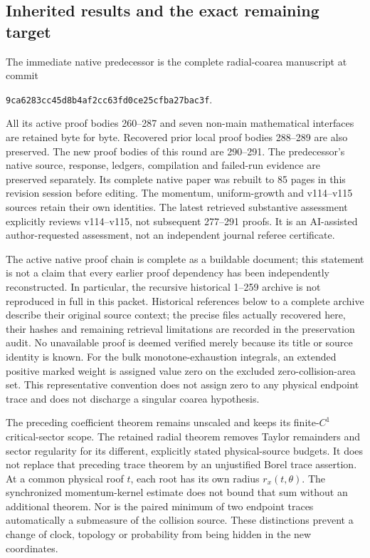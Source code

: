 \documentclass[11pt,reqno]{amsart}
\numberwithin{equation}{section}
\theoremstyle{definition}\newtheorem{definition}[theorem]{Definition}
\theoremstyle{remark}\newtheorem{remark}[theorem]{Remark}
\begin{document}
\subsection*{Inherited results and the exact remaining target}
The immediate native predecessor is the complete radial-coarea manuscript
at commit
\begin{center}
\texttt{9ca6283c\allowbreak c45d8b4a\allowbreak f2cc63fd\allowbreak 0ce25cfb\allowbreak a27bac3f}.
\end{center}
All its active proof bodies 260--287 and seven non-main mathematical
interfaces are retained byte for byte. Recovered prior local proof bodies
288--289 are also preserved. The new proof bodies of this round are
290--291. The predecessor's native source, response, ledgers, compilation
and failed-run evidence are preserved separately. Its complete native
paper was rebuilt to 85 pages in this revision session before editing.
The momentum, uniform-growth and v114--v115 sources retain their own
identities. The latest retrieved substantive assessment explicitly
reviews v114--v115, not subsequent 277--291 proofs. It is an
AI-assisted author-requested assessment, not an independent journal
referee certificate.

The active native proof chain is complete as a buildable document;
this statement is not a claim that every earlier proof dependency has
been independently reconstructed. In particular, the recursive historical
1--259 archive is not reproduced in full in this packet. Historical
references below to a complete archive describe their original source
context; the precise files actually recovered here, their hashes and
remaining retrieval limitations are recorded in the preservation audit.
No unavailable proof is deemed verified merely because its title or
source identity is known.
For the bulk monotone-exhaustion integrals, an extended positive marked
weight is assigned value zero on the excluded zero-collision-area set.
This representative convention does not assign zero to any physical
endpoint trace and does not discharge a singular coarea hypothesis.


The preceding coefficient theorem remains unscaled and keeps its
finite-$C^1$ critical-sector scope. The retained radial theorem removes
Taylor remainders and sector regularity for its different, explicitly
stated physical-source budgets. It does not replace that preceding
trace theorem by an unjustified Borel trace assertion. At a common
physical roof $t$, each root has its own radius $r_x(t,\theta)$.
The synchronized momentum-kernel estimate does not bound that sum
without an additional theorem. Nor is the paired minimum of two
endpoint traces automatically a submeasure of the collision source.
These distinctions prevent a change of clock, topology or probability
from being hidden in the new coordinates.
\end{document}
